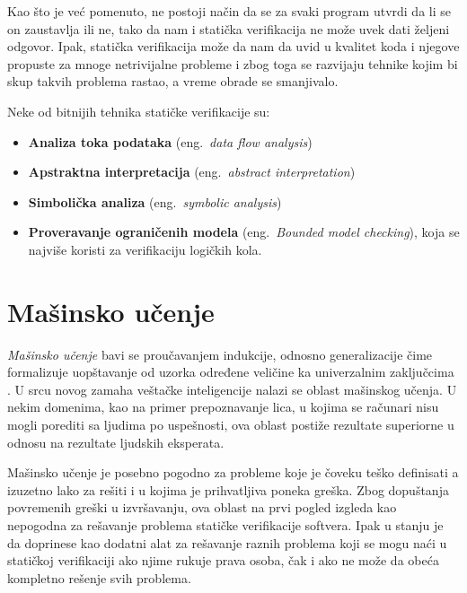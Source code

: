\documentclass[a4paper]{article}
\theoremstyle{definition}
\begin{document}
{\par Kao što je već pomenuto, ne postoji način da se za svaki program utvrdi da li se on zaustavlja ili ne, tako da nam i statička verifikacija ne može uvek dati željeni odgovor. Ipak, statička verifikacija može da nam da uvid u kvalitet koda i njegove propuste za mnoge netrivijalne probleme i zbog toga se razvijaju tehnike kojim bi skup takvih problema rastao, a vreme obrade se smanjivalo. 

\par Neke od bitnijih tehnika statičke verifikacije su:
\begin{itemize}
\item \textbf{Analiza toka podataka} (eng.~{\em data flow analysis})
\item \textbf{Apstraktna interpretacija} (eng.~{\em abstract interpretation})
\item \textbf{Simbolička analiza} (eng.~{\em symbolic analysis})
\item \textbf{Proveravanje ograničenih modela} (eng.~{\em Bounded model che\-cking}), koja se najviše koristi za verifikaciju logičkih kola.
\end{itemize}


\section{Mašinsko učenje}

\textit{Mašinsko učenje} bavi se proučavanjem indukcije, odnosno generalizacije 
čime formalizuje uopštavanje od uzorka određene veličine ka univerzalnim zaključcima \cite{bishopML}.
U srcu novog zamaha veštačke inteligencije nalazi se oblast mašinskog učenja. 
U nekim domenima, kao na primer prepoznavanje lica, u kojima se računari nisu 
mogli porediti sa ljudima po uspešnosti, ova oblast postiže rezultate superiorne 
u odnosu na rezultate ljudskih eksperata.


Mašinsko učenje je posebno pogodno za probleme koje je čoveku teško definisati a 
izuzetno lako za rešiti i u kojima je prihvatljiva poneka greška. Zbog dopuštanja 
povremenih greški u izvršavanju, ova oblast na prvi pogled izgleda kao nepogodna 
za rešavanje problema statičke verifikacije softvera. Ipak u stanju je da doprinese 
kao dodatni alat za rešavanje raznih problema koji se mogu naći u statičkoj 
verifikaciji ako njime rukuje prava osoba, čak i ako ne može da obeća kompletno 
rešenje svih problema.

}
\end{document}
